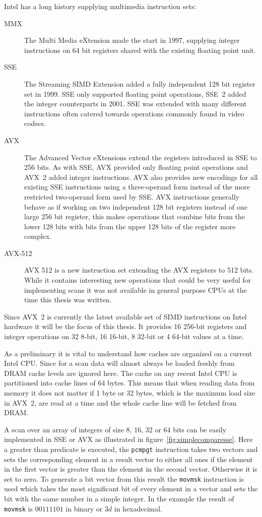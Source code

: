 Intel has a long history supplying multimedia instruction sets:
\begin{description}
\item[MMX] The Multi Media eXtension made the start in 1997, supplying integer
instructions on 64 bit registers shared with the existing floating point unit.
\item[SSE] The Streaming SIMD Extension added a fully independent 128 bit
register set in 1999. SSE only supported floating point operations, SSE~2 added
the integer counterparts in 2001. SSE was extended with many different
instructions often catered towards operations commonly found in video codecs.
\item[AVX] The Advanced Vector eXtensions extend the registers introduced in
SSE to 256 bits. As with SSE, AVX provided only floating point operations and
AVX~2 added integer instructions. AVX also provides new encodings for all
existing SSE instructions using a three-operand form instead of the more
restricted two-operand form used by SSE. AVX instructions generally behave as
if working on two independent 128 bit registers instead of one large 256 bit
register, this makes operations that combine bits from the lower 128 bits with
bits from the upper 128 bits of the register more complex.
\item[AVX-512] AVX 512 is a new instruction set extending the AVX registers to
512 bits. While it contains interesting new operations that could be very
useful for implementing scans it was not available in general purpose CPUs at
the time this thesis was written.
\end{description}

Since AVX~2 is currently the latest available set of SIMD instructions on Intel
hardware it will be the focus of this thesis. It provides 16 256-bit registers
and integer operations on 32 8-bit, 16 16-bit, 8 32-bit or 4 64-bit values at a
time.

As a preliminary it is vital to understand how caches are organized on a
current Intel CPU. Since for a scan data will almost always be loaded freshly
from DRAM cache levels are ignored here. The cache on any recent Intel CPU is
partitioned into cache lines of 64 bytes. This means that when reading data
from memory it does not matter if 1 byte or 32 bytes, which is the maximum load
size in AVX~2, are read at a time and the whole cache line will be fetched from
DRAM.

A scan over an array of integers of size 8, 16, 32 or 64 bits can be
easily implemented in SSE or AVX as illustrated in
figure~\ref{fig:simplecomparesse}. Here a greater than predicate is executed,
the \texttt{pcmpgt} instruction takes two vectors and sets the corresponding
element in a result vector to either all ones if the element in the first
vector is greater than the element in the second vector. Otherwise it is set to
zero. To generate a bit vector from this result the \texttt{movmsk} instruction
is used which takes the most significant bit of every element in a vector and
sets the bit with the same number in a simple integer. In the example the
result of \texttt{movmsk} is $00111101$ in binary or $3d$ in hexadecimal.

